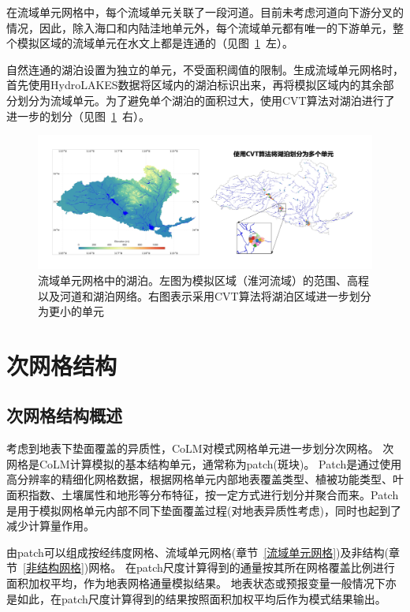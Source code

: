 在流域单元网格中，每个流域单元关联了一段河道。目前未考虑河道向下游分叉的情况，因此，除入海口和内陆洼地单元外，每个流域单元都有唯一的下游单元，整个模拟区域的流域单元在水文上都是连通的（见图~\ref{fig:湖泊划分}~左）。

自然连通的湖泊设置为独立的单元，不受面积阈值的限制。生成流域单元网格时，首先使用HydroLAKES数据\citep{messager2016nc}将区域内的湖泊标识出来，再将模拟区域内的其余部分划分为流域单元。为了避免单个湖泊的面积过大，使用CVT算法\citep{du1999siam}对湖泊进行了进一步的划分（见图~\ref{fig:湖泊划分}~右）。
{
\begin{figure}[htbp]
\centering
\includegraphics[width=\textwidth]{Figures/模式构架/湖泊划分.jpg}
\caption[流域单元网格中的湖泊]{流域单元网格中的湖泊。左图为模拟区域（淮河流域）的范围、高程以及河道和湖泊网络。右图表示采用CVT算法将湖泊区域进一步划分为更小的单元}
\label{fig:湖泊划分}
\end{figure}
}



\section{次网格结构}\label{次网格}

\subsection{次网格结构概述}
考虑到地表下垫面覆盖的异质性，CoLM对模式网格单元进一步划分次网格。
次网格是CoLM计算模拟的基本结构单元，通常称为patch(斑块)。
Patch是通过使用高分辨率的精细化网格数据，根据网格单元内部地表覆盖类型、植被功能类型、叶面积指数、土壤属性和地形等分布特征，按一定方式进行划分并聚合而来。Patch是用于模拟网格单元内部不同下垫面覆盖过程(对地表异质性考虑)，同时也起到了减少计算量作用。


由patch可以组成按经纬度网格、流域单元网格(章节~\ref{流域单元网格})及非结构(章节~\ref{非结构网格})网格。
在patch尺度计算得到的通量按其所在网格覆盖比例进行面积加权平均，作为地表网格通量模拟结果。
地表状态或预报变量一般情况下亦是如此，在patch尺度计算得到的结果按照面积加权平均后作为模式结果输出。

